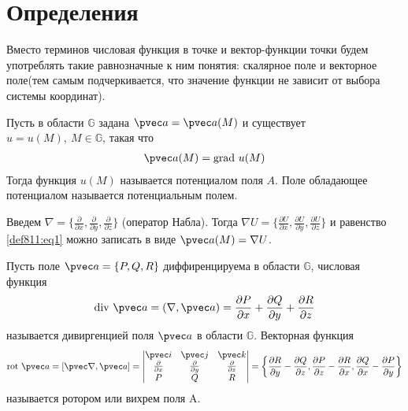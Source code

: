 \section{Определения}
Вместо терминов числовая функция в точке и вектор-функции точки будем
употреблять такие равнозначные к ним понятия: скалярное поле и векторное
поле(тем самым подчеркивается, что значение функции не зависит от выбора
системы координат).

\begin{definition}
  Пусть в области $\mathbb{G}$ задана $\pvec a = \pvec a(M)$ и существует $u =
  u(M), \ M \in \mathbb{G}$, такая что
  \begin{gather}
    \pvec a(M) = \mbox{grad} \ u(M)
    \label{def811:eq1}
  \end{gather}
  Тогда функция $u(M)$ называется потенциалом поля $A$. Поле обладающее
  потенциалом называется потенциальным полем.
\end{definition}

Введем $\nabla = \{\frac{\partial}{\partial x}, \frac{\partial}{\partial y},
\frac{\partial}{\partial z}\}$ (оператор Набла). Тогда $\nabla U =
\{\frac{\partial U}{\partial x}, \frac{\partial U}{\partial y},
\frac{\partial U}{\partial z}\}$ и равенство \eqref{def811:eq1} можно записать
в виде $\pvec a(M) = \nabla U$.

\begin{definition}
  Пусть поле $\pvec a = \{P, Q, R\}$ диффиренцируема в области $\mathbb{G}$,
  числовая функция
  \begin{gather*}
    \mbox{div} \ \pvec a = (\nabla, \pvec a) = \frac{\partial P}{\partial x} +
    \frac{\partial Q}{\partial y} + \frac{\partial R}{\partial z}
  \end{gather*}
  называется дивиргенцией поля $\pvec a$ в области $\mathbb{G}$.
  Векторная функция
  \begin{gather*}
    \mbox{rot} \ \pvec a = [\pvec \nabla, \pvec a] =
    \begin{vmatrix}
      \pvec i & \pvec j & \pvec k \\
      \frac{\partial }{\partial x} & \frac{\partial }{\partial y} &
      \frac{\partial }{\partial z} \\
      P & Q & R
    \end{vmatrix} =
    \left\{\frac{\partial R}{\partial y} - \frac{\partial Q}{\partial z},
    \frac{\partial P}{\partial z} - \frac{\partial R}{\partial x},
    \frac{\partial Q}{\partial x} - \frac{\partial P}{\partial y}\right\}
  \end{gather*}
  называется ротором или вихрем поля A.
\end{definition}

